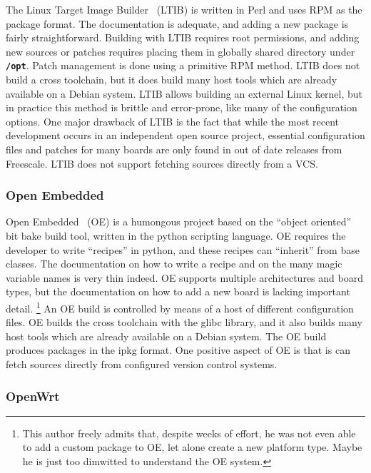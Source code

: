 \documentclass[a4paper,10pt]{article}
\newcommand{\fw}{\tt\bf}
\begin{document}
    The Linux Target Image Builder~\cite{ltib} (LTIB) is written in
    Perl and uses RPM as the package format. The documentation is
    adequate, and adding a new package is fairly straightforward.
    Building with LTIB requires root permissions, and adding new
    sources or patches requires placing them in globally shared
    directory under {\fw /opt}.
%
    Patch management is done using a primitive RPM method. LTIB does
    not build a cross toolchain, but it does build many host tools
    which are already available on a Debian system.
%
    LTIB allows building an external Linux kernel, but in practice
    this method is brittle and error-prone, like many of the
    configuration options. One major drawback of LTIB is the fact that
    while the most recent development occurs in an independent open
    source project, essential configuration files and patches for many
    boards are only found in out of date releases from Freescale.
    LTIB does not support fetching sources directly from a VCS.

\subsubsection{Open Embedded}

    Open Embedded~\cite{oe} (OE) is a humongous project based on the
    ``object oriented'' bit bake build tool, written in the python
    scripting language. OE requires the developer to write ``recipes''
    in python, and these recipes can ``inherit'' from base classes.
    The documentation on how to write a recipe and on the many magic
    variable names is very thin indeed. OE supports multiple
    architectures and board types, but the documentation on how to add
    a new board is lacking important detail.%
    \footnote {
      This author freely admits that, despite weeks of effort, he was
      not even able to add a custom package to OE, let alone create a
      new platform type. Maybe he is just too dimwitted to understand
      the OE system.
    }
    An OE build is controlled by means of a host of different
    configuration files.  OE builds the cross toolchain with the glibc
    library, and it also builds many host tools which are already
    available on a Debian system. The OE build produces packages in
    the ipkg format.  One positive aspect of OE is that is can fetch
    sources directly from configured version control systems.

\subsubsection{OpenWrt}
\end{document}
